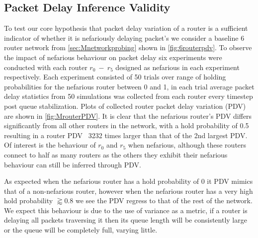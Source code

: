 \subsection*{Packet Delay Inference Validity}
To test our core hypothesis that packet delay variation of a router is a sufficient indicator of whether it is nefariously delaying packet's we consider a baseline 6 router network from \cref{sec:Mnetworkprobing} shown in \cref{fig:6routerpdv}. To observe the impact of nefarious behaviour on packet delay six experiments were conducted with each router $r_0\ -\ r_5$ designed as nefarious in each experiment respectively. Each experiment consisted of 50 trials over range of holding probabilities for the nefarious router between 0 and 1, in each trial average packet delay statistics from 50 simulations was collected from each router every timestep post queue stabilization. Plots of collected router packet delay variation (PDV) are shown in \cref{fig:MrouterPDV}. It is clear that the nefarious router's PDV differs significantly from all other routers in the network, with a hold probability of 0.5 resulting in a router PDV ~3232 times larger than that of the 2nd largest PDV. Of interest is the behaviour of $r_0$ and $r_5$ when nefarious, although these routers connect to half as many routers as the others they exhibit their nefarious behaviour can still be inferred through PDV.\par
As expected when the nefarious router has a hold probability of 0 it PDV mimics that of a non-nefarious router, however when the nefarious router has a very high hold probability $\gtrapprox 0.8$ we see the PDV regress to that of the rest of the network. We expect this behaviour is due to the use of variance as a metric, if a router is delaying all packets traversing it then its queue length will be consistently large or the queue will be completely full, varying little.
